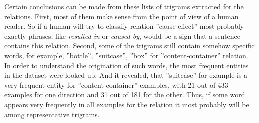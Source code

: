Certain conclusions can be made from these lists of trigrams extracted for the relations. First, most of them make sense from the point of view of a human reader. So if a human will try to classify relation ''cause-effect'' most probably exactly phrases, like \textit{resulted in} or \textit{caused by}, would be a sign that a sentence contains this relation. Second, some of the trigrams still contain somehow specific words, for example, ''bottle'', ''suitcase'', ''box'' for ''content-container'' relation. In order to understand the origination of such words, the most frequent entities in the dataset were looked up. And it revealed, that ''suitcase'' for example is a very frequent entity for ''content-container'' examples, with 21 out of 433 examples for one direction and 31 out of 181 for the other. Thus, if some word appears very frequently in all examples for the relation it most probably will be among representative trigrams.

